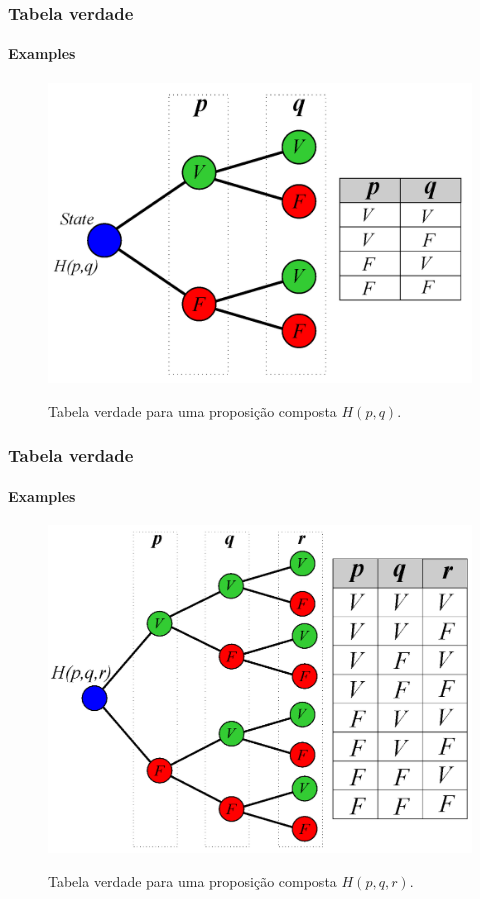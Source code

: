 \documentclass[10pt, headsepline, captions=tableabove, xcolor=table]{beamer}
\begin{document}
\begin{frame}[c]
    \frametitle{Tabela verdade}
    \framesubtitle{Examples}
    \begin{figure}[c]
        \centering
        \caption{Tabela verdade para uma proposição composta $H(p,q)$.}
        \includegraphics[scale=0.30]{TT3.png}
        \label{fig:tabela-verdade2}
    \end{figure}
\end{frame}
%
\begin{frame}[c]
    \frametitle{Tabela verdade}
    \framesubtitle{Examples}
    \begin{figure}[c]
        \centering
        \caption{Tabela verdade para uma proposição composta $H(p,q,r)$.}
        \includegraphics[scale=0.30]{TT4.png}
        \label{fig:tabela-verdade3}
    \end{figure}
\end{frame}
%
\end{document}
